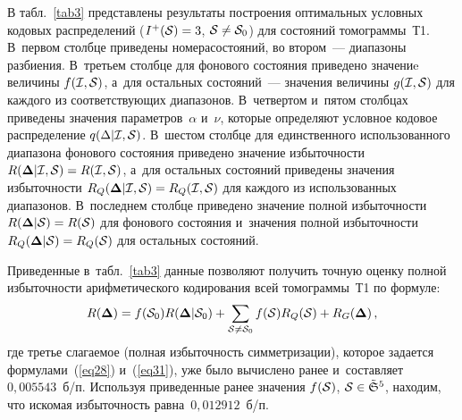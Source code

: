 \begin{multicols}{2}
{ }

В табл.~\ref{tab3} представлены результаты по\-стро\-ения оптимальных условных 
кодовых распределений ($I^+({\cal S})\hm=3$, ${\cal S}\hm\neq {\cal S}_0$) для 
состояний томограммы~Т1. В~первом столбце приведены номера\linebreak состояний, во втором~--- 
диапазоны разбиения. В~третьем столбце для фонового состояния приведено значениe
 величины $f({\cal I},{\cal S})$, а~для остальных состояний~--- 
 значения величины $g({\cal I},{\cal S})$ для каж\-до\-го из соответствующих диапазонов. 
 В~четвертом и~пятом столбцах приведены значения па\-ра\-мет\-ров~$\alpha$ и~$\nu$, 
 которые определяют условное кодовое распределение $q(\Delta|{\cal I},{\cal S})$. 
 В~шестом столбце для единственного использованного диапазона фонового состояния 
 приведено значение избыточности $R(\boldsymbol{\Delta}|{\cal I},{\cal S}) \hm= 
 R({\cal I},{\cal S})$, а~для остальных состояний приведены значения 
 избыточности $R_Q(\boldsymbol{\Delta}|{\cal I},{\cal S}) \hm= 
 R_Q({\cal I},{\cal S})$ для каждого из использованных диапазонов. 
 В~последнем столбце приведено значение полной избыточности 
 $R(\boldsymbol{\Delta}|{\cal S}) \hm= R({\cal S})$ для фонового состояния и~значения 
 полной избыточности $R_Q(\boldsymbol{\Delta}|{\cal S}) \hm= 
 R_Q({\cal S})$ для остальных состояний.


Приведенные в~табл.~\ref{tab3} данные позволяют получить точную оценку 
полной избыточности арифметического кодирования всей томограммы~Т1 по формуле:
$$
R(\boldsymbol{\Delta}) = f({\cal S}_0) R(\boldsymbol{\Delta}|{\cal S}_0) +
\sum\limits_{{\cal S}\neq{\cal S}_0} f({\cal S})R_Q({\cal S}) + 
R_G(\boldsymbol{\Delta})\,,
$$
где третье слагаемое (полная избыточность симметризации), 
которое задается формулами~(\ref{eq28}) и~(\ref{eq31}), уже было 
вычислено ранее и~составляет~$0{,}005543$~б/п. Используя приведенные ранее 
значения $f(\cal S)$, ${\cal S}\hm\in\tilde{\frak S}^5$, находим, что искомая 
избыточность равна~$0{,}012912$~б/п.

\begin{table*}[b]\small
\begin{center}
\label{tab4}
\vspace{2ex}


\end{center}
\end{table*}
\end{multicols}
